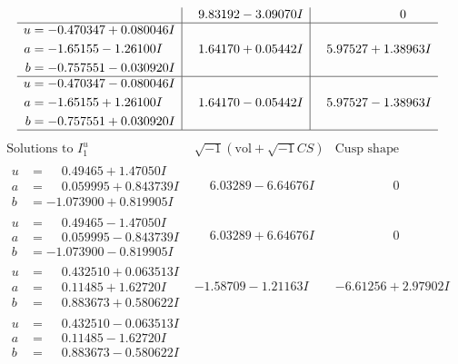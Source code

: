 \documentclass[1p]{elsarticle_modified}
\theoremstyle{definition}
\newcommand{\I}{\sqrt{-1}}
\begin{document}
$$\begin{array}{c|c|c}
 & \phantom{-}9.83192 - 3.09070 I & \phantom{-0.000000 } 0 \\ \hline\begin{aligned}
u &= -0.470347 + 0.080046 I \\
a &= -1.65155 - 1.26100 I \\
b &= -0.757551 - 0.030920 I\end{aligned}
 & \phantom{-}1.64170 + 0.05442 I & \phantom{-}5.97527 + 1.38963 I \\ \hline\begin{aligned}
u &= -0.470347 - 0.080046 I \\
a &= -1.65155 + 1.26100 I \\
b &= -0.757551 + 0.030920 I\end{aligned}
 & \phantom{-}1.64170 - 0.05442 I & \phantom{-}5.97527 - 1.38963 I\\
 \hline 
 \end{array}$$\newpage$$\begin{array}{c|c|c}  
\text{Solutions to }I^u_{1}& \I (\text{vol} + \sqrt{-1}CS) & \text{Cusp shape}\\
 \hline 
\begin{aligned}
u &= \phantom{-}0.49465 + 1.47050 I \\
a &= \phantom{-}0.059995 + 0.843739 I \\
b &= -1.073900 + 0.819905 I\end{aligned}
 & \phantom{-}6.03289 - 6.64676 I & \phantom{-0.000000 } 0 \\ \hline\begin{aligned}
u &= \phantom{-}0.49465 - 1.47050 I \\
a &= \phantom{-}0.059995 - 0.843739 I \\
b &= -1.073900 - 0.819905 I\end{aligned}
 & \phantom{-}6.03289 + 6.64676 I & \phantom{-0.000000 } 0 \\ \hline\begin{aligned}
u &= \phantom{-}0.432510 + 0.063513 I \\
a &= \phantom{-}0.11485 + 1.62720 I \\
b &= \phantom{-}0.883673 + 0.580622 I\end{aligned}
 & -1.58709 - 1.21163 I & -6.61256 + 2.97902 I \\ \hline\begin{aligned}
u &= \phantom{-}0.432510 - 0.063513 I \\
a &= \phantom{-}0.11485 - 1.62720 I \\
b &= \phantom{-}0.883673 - 0.580622 I\end{aligned}

\end{array}$$
\end{document}
